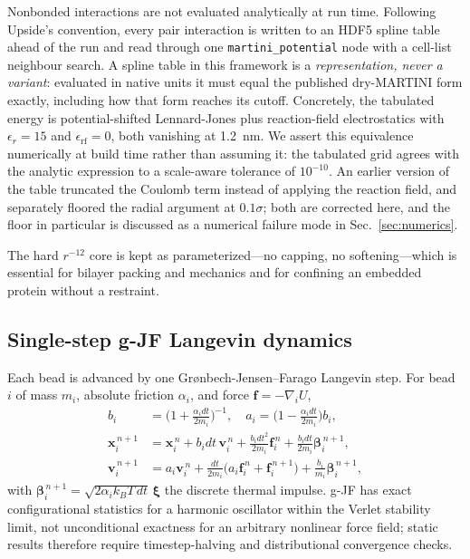 \documentclass[journal=jctcce,manuscript=article,layout=twocolumn]{achemso}
\begin{document}
Nonbonded interactions are not evaluated analytically at run time. Following
Upside's convention, every pair interaction is written to an HDF5 spline table ahead
of the run and read through one \texttt{martini\_potential} node with a cell-list
neighbour search. A spline table in this framework is a \emph{representation, never
a variant}: evaluated in native units it must equal the published dry-MARTINI form
exactly, including how that form reaches its cutoff. Concretely, the tabulated
energy is potential-shifted Lennard-Jones plus reaction-field electrostatics with
$\epsilon_r=15$ and $\epsilon_\mathrm{rf}=0$, both vanishing at 1.2~nm. We assert
this equivalence numerically at build time rather than assuming it: the tabulated
grid agrees with the analytic expression to a scale-aware tolerance of $10^{-10}$.
An earlier version of the table truncated the Coulomb term instead of applying the
reaction field, and separately floored the radial argument at $0.1\sigma$; both are
corrected here, and the floor in particular is discussed as a numerical failure mode
in Sec.~\ref{sec:numerics}.

The hard $r^{-12}$ core is kept as parameterized---no capping, no softening---which
is essential for bilayer packing and mechanics and for confining an embedded protein
without a restraint.

\subsection{Single-step g-JF Langevin dynamics}
\label{sec:langevin}

Each bead is advanced by one Gr\o{}nbech-Jensen--Farago Langevin
step.\cite{GronbechJensen2013} For bead $i$ of mass $m_i$, absolute friction
$\alpha_i$, and force $\mathbf{f}=-\nabla_i U$,
\begin{align}
b_i &= \Big(1+\tfrac{\alpha_i dt}{2m_i}\Big)^{-1}, \quad
a_i = \Big(1-\tfrac{\alpha_i dt}{2m_i}\Big) b_i, \\
\mathbf{x}_i^{\,n+1} &= \mathbf{x}_i^{\,n} + b_i dt\,\mathbf{v}_i^{\,n}
  + \tfrac{b_i dt^2}{2m_i}\mathbf{f}_i^{\,n}
  + \tfrac{b_i dt}{2m_i}\boldsymbol{\beta}_i^{\,n+1}, \\
\mathbf{v}_i^{\,n+1} &= a_i\mathbf{v}_i^{\,n}
  + \tfrac{dt}{2m_i}\big(a_i\mathbf{f}_i^{\,n}+\mathbf{f}_i^{\,n+1}\big)
  + \tfrac{b_i}{m_i}\boldsymbol{\beta}_i^{\,n+1},
\label{eq:gjf}
\end{align}
with $\boldsymbol{\beta}_i^{\,n+1}=\sqrt{2\alpha_i k_BT\,dt}\,\boldsymbol{\xi}$ the
discrete thermal impulse. g-JF has exact configurational statistics for a harmonic
oscillator within the Verlet stability limit, not unconditional exactness for an
arbitrary nonlinear force field; static results therefore require timestep-halving
and distributional convergence checks.
\end{document}
